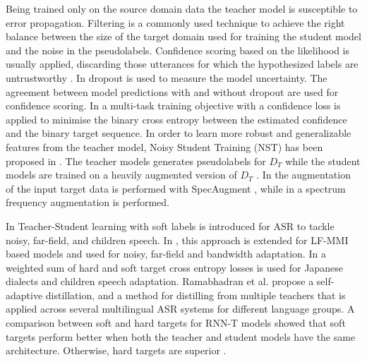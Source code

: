 \documentclass[journal]{IEEEtran}
\begin{document}
Being trained only on the source domain data the teacher model is susceptible to error propagation.
Filtering is a commonly used technique to achieve the right
balance between the size of the target domain used for training the student model and the noise in the pseudolabels.
Confidence scoring based on the likelihood is usually applied, discarding those utterances for which the hypothesized labels are untrustworthy  \cite{selftrainASR4}.
In \cite{selftrainASRDUST} dropout is used to measure the model uncertainty. The agreement between model predictions with and without dropout are used for confidence scoring.
 In \cite{google21domain} a  multi-task training objective with a confidence loss is applied to minimise
the binary cross entropy between the estimated confidence
and the binary target sequence.
In order to learn more robust and generalizable features from the teacher model,  Noisy Student Training (NST) has been proposed in \cite{Park_2020}.
The teacher models generates pseudolabels for $D_T$ while the student models are trained on a heavily augmented version of $D_T$ \cite{Park_2020}. In \cite{Park_2020, nstNeurips} the augmentation of the input target data is performed with SpecAugment \cite{park2019specaugment}, while in \cite{selftrainSoftandHard} a spectrum frequency augmentation is performed.

In \cite{selftrainASRSoftFirst} Teacher-Student learning with soft labels is introduced for ASR to tackle noisy, far-field, and children speech. In \cite{selftrainSoftpovey}, this approach is extended for LF-MMI based models and used for noisy, far-field and bandwidth  adaptation. In  \cite{selftrainSoftandHard} a weighted sum of hard and soft target cross entropy losses is used for Japanese dialects and children speech adaptation.  Ramabhadran et al. \cite{selftrainSoft2} propose a self-adaptive distillation, and a method for distilling from
multiple teachers that is applied across several multilingual ASR
systems for different language groups.
A comparison between soft and hard targets for RNN-T models \cite{rnnt} showed that soft targets perform better
when both the teacher and student models have the same architecture. Otherwise, hard targets are superior \cite{sleftrainSoft3}.
\end{document}
